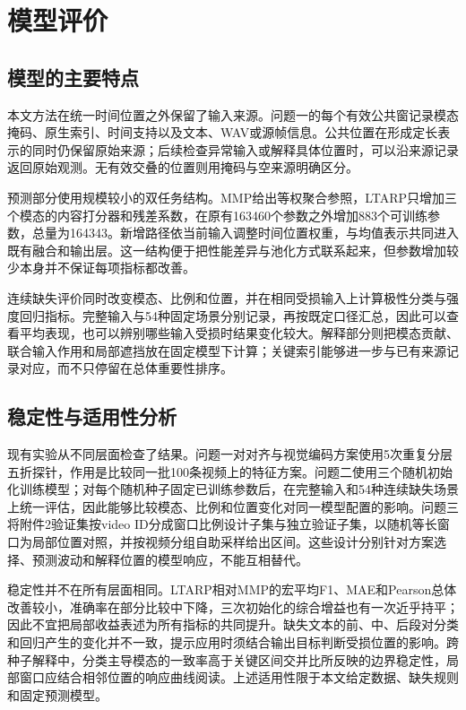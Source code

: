 \section{模型评价}\label{sec:model_evaluation}

\subsection{模型的主要特点}\label{subsec:evaluation_features}

本文方法在统一时间位置之外保留了输入来源。问题一的每个有效公共窗记录模态掩码、原生索引、时间支持以及文本、WAV或源帧信息。公共位置在形成定长表示的同时仍保留原始来源；后续检查异常输入或解释具体位置时，可以沿来源记录返回原始观测。无有效交叠的位置则用掩码与空来源明确区分。

预测部分使用规模较小的双任务结构。MMP给出等权聚合参照，LTARP只增加三个模态的内容打分器和残差系数，在原有163460个参数之外增加883个可训练参数，总量为164343。新增路径依当前输入调整时间位置权重，与均值表示共同进入既有融合和输出层。这一结构便于把性能差异与池化方式联系起来，但参数增加较少本身并不保证每项指标都改善。

连续缺失评价同时改变模态、比例和位置，并在相同受损输入上计算极性分类与强度回归指标。完整输入与54种固定场景分别记录，再按既定口径汇总，因此可以查看平均表现，也可以辨别哪些输入受损时结果变化较大。解释部分则把模态贡献、联合输入作用和局部遮挡放在固定模型下计算；关键索引能够进一步与已有来源记录对应，而不只停留在总体重要性排序。

\subsection{稳定性与适用性分析}\label{subsec:evaluation_stability}

现有实验从不同层面检查了结果。问题一对对齐与视觉编码方案使用5次重复分层五折探针，作用是比较同一批100条视频上的特征方案。问题二使用三个随机初始化训练模型；对每个随机种子固定已训练参数后，在完整输入和54种连续缺失场景上统一评估，因此能够比较模态、比例和位置变化对同一模型配置的影响。问题三将附件2验证集按video ID分成窗口比例设计子集与独立验证子集，以随机等长窗口为局部位置对照，并按视频分组自助采样给出区间。这些设计分别针对方案选择、预测波动和解释位置的模型响应，不能互相替代。

稳定性并不在所有层面相同。LTARP相对MMP的宏平均F1、MAE和Pearson总体改善较小，准确率在部分比较中下降，三次初始化的综合增益也有一次近乎持平；因此不宜把局部收益表述为所有指标的共同提升。缺失文本的前、中、后段对分类和回归产生的变化并不一致，提示应用时须结合输出目标判断受损位置的影响。跨种子解释中，分类主导模态的一致率高于关键区间交并比所反映的边界稳定性，局部窗口应结合相邻位置的响应曲线阅读。上述适用性限于本文给定数据、缺失规则和固定预测模型。

